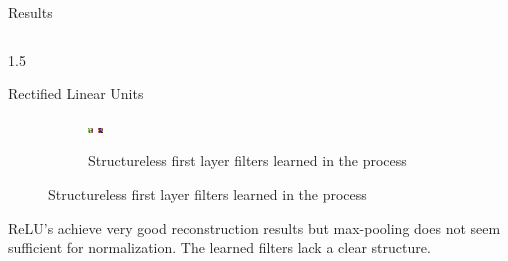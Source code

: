 \documentclass[final]{beamer}
\newlength{\onecolwid}
\newlength{\threecolwid}
\begin{document}
\begin{frame}[t]
\begin{columns}[t]
\begin{column}{\threecolwid}
\begin{alertblock}{Results}
\begin{columns}[t]
\begin{column}{1.5\onecolwid}
\begin{block}{Rectified Linear Units}
\begin{figure}
\begin{subfigure}{0.4\linewidth}
					\includegraphics[width=0.1\linewidth]{graphics/reconstructions/cifar/relu/relu_filter_07.png} \hspace{0.05\linewidth}
					\includegraphics[width=0.1\linewidth]{graphics/reconstructions/cifar/relu/relu_filter_08.png} 

					\caption{Structureless first layer filters learned in the process}

				\end{subfigure}


			\end{figure}

			ReLU's achieve very good reconstruction results but max-pooling does not seem sufficient for normalization. The learned filters lack a clear structure.

		\end{block}

		\end{column}



\end{columns}

\end{alertblock}


\end{column}
\end{columns} %


\end{frame} %
\end{document}
